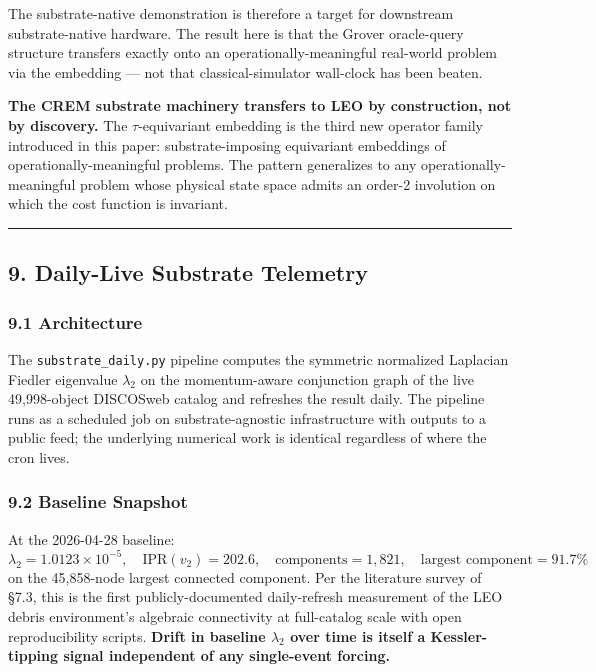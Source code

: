 \documentclass[
]{article}
\begin{document}
The substrate-native demonstration is therefore a target for downstream
substrate-native hardware. The result here is that the Grover
oracle-query structure transfers exactly onto an
operationally-meaningful real-world problem via the embedding --- not
that classical-simulator wall-clock has been beaten.

\textbf{The CREM substrate machinery transfers to LEO by construction,
not by discovery.} The \(\tau\)-equivariant embedding is the third new
operator family introduced in this paper: substrate-imposing equivariant
embeddings of operationally-meaningful problems. The pattern generalizes
to any operationally-meaningful problem whose physical state space
admits an order-2 involution on which the cost function is invariant.

\begin{center}\rule{0.5\linewidth}{0.5pt}\end{center}

\subsection{9. Daily-Live Substrate
Telemetry}\label{daily-live-substrate-telemetry}

\subsubsection{9.1 Architecture}\label{architecture}

The \texttt{substrate\_daily.py} pipeline computes the symmetric
normalized Laplacian Fiedler eigenvalue \(\lambda_2\) on the
momentum-aware conjunction graph of the live 49,998-object DISCOSweb
catalog and refreshes the result daily. The pipeline runs as a scheduled
job on substrate-agnostic infrastructure with outputs to a public feed;
the underlying numerical work is identical regardless of where the cron
lives.

\subsubsection{9.2 Baseline Snapshot}\label{baseline-snapshot}

At the 2026-04-28 baseline:
\[\lambda_2 = 1.0123 \times 10^{-5}, \quad \text{IPR}(v_2) = 202.6, \quad \text{components} = 1{,}821, \quad \text{largest component} = 91.7\%\]
on the 45,858-node largest connected component. Per the literature
survey of §7.3, this is the first publicly-documented daily-refresh
measurement of the LEO debris environment's algebraic connectivity at
full-catalog scale with open reproducibility scripts. \textbf{Drift in
baseline \(\lambda_2\) over time is itself a Kessler-tipping signal
independent of any single-event forcing.}
\end{document}
